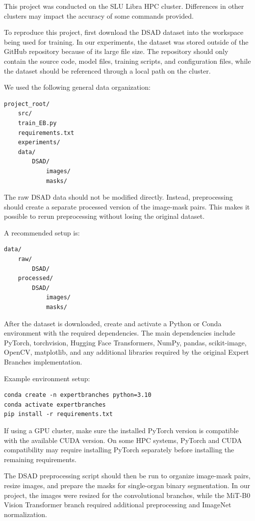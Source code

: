 \documentclass[twocolumn]{article}
\begin{document}
This project was conducted on the SLU Libra HPC cluster. Differences in other clusters may impact the accuracy of some commands provided.

To reproduce this project, first download the DSAD dataset into the workspace being used for training. In our experiments, the dataset was stored outside of the GitHub repository because of its large file size. The repository should only contain the source code, model files, training scripts, and configuration files, while the dataset should be referenced through a local path on the cluster.

We used the following general data organization:

\begin{verbatim}
project_root/
    src/
    train_EB.py
    requirements.txt
    experiments/
    data/
        DSAD/
            images/
            masks/
\end{verbatim}

The raw DSAD data should not be modified directly. Instead, preprocessing should create a separate processed version of the image-mask pairs. This makes it possible to rerun preprocessing without losing the original dataset.

A recommended setup is:

\begin{verbatim}
data/
    raw/
        DSAD/
    processed/
        DSAD/
            images/
            masks/
\end{verbatim}

After the dataset is downloaded, create and activate a Python or Conda environment with the required dependencies. The main dependencies include PyTorch, torchvision, Hugging Face Transformers, NumPy, pandas, scikit-image, OpenCV, matplotlib, and any additional libraries required by the original Expert Branches implementation.

Example environment setup:

\begin{verbatim}
conda create -n expertbranches python=3.10
conda activate expertbranches
pip install -r requirements.txt
\end{verbatim}

If using a GPU cluster, make sure the installed PyTorch version is compatible with the available CUDA version. On some HPC systems, PyTorch and CUDA compatibility may require installing PyTorch separately before installing the remaining requirements.

The DSAD preprocessing script should then be run to organize image-mask pairs, resize images, and prepare the masks for single-organ binary segmentation. In our project, the images were resized for the convolutional branches, while the MiT-B0 Vision Transformer branch required additional preprocessing and ImageNet normalization.
\end{document}
